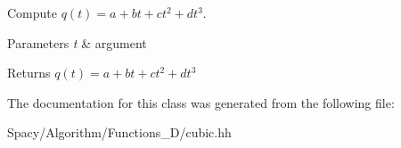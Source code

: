 Compute $q(t) = a + bt + ct^2 + dt^3 $. 


\begin{DoxyParams}{Parameters}
{\em t} & argument \\
\hline
\end{DoxyParams}
\begin{DoxyReturn}{Returns}
$q(t) = a + bt + ct^2 + dt^3 $ 
\end{DoxyReturn}


The documentation for this class was generated from the following file\+:\begin{DoxyCompactItemize}
\item 
Spacy/\+Algorithm/\+Functions\+\_\+D/cubic.\+hh\end{DoxyCompactItemize}
